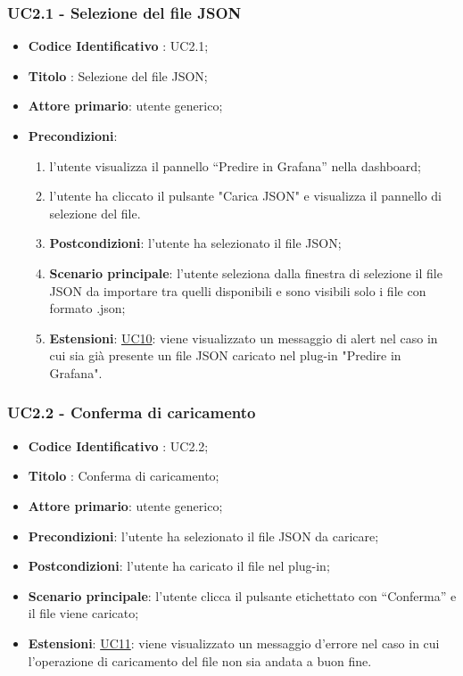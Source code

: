 		
		\label{par:UC2.1}
		\subsubsection{UC2.1 - Selezione del file JSON}
		\begin{itemize}
			\item\textbf{Codice Identificativo} : UC2.1;
			\item\textbf{Titolo} : Selezione del file JSON;
			\item\textbf{Attore primario}: utente generico;
			\item\textbf{Precondizioni}:
				\begin{enumerate}
					\item l'utente visualizza il pannello “Predire in Grafana” nella dashboard;
					\item l'utente ha cliccato il pulsante "Carica JSON" e visualizza il pannello di selezione del file.
			\item\textbf{Postcondizioni}: l'utente ha selezionato il file JSON;
			\item\textbf{Scenario principale}: l'utente seleziona dalla finestra di selezione il file JSON da importare tra quelli disponibili e sono visibili solo i file con formato .json;
			\item\textbf{Estensioni}: \hyperref[par:UC10]{UC10}: viene visualizzato un messaggio di alert nel caso in cui sia già presente un file JSON caricato nel plug-in "Predire in Grafana".
				\end{enumerate}
			\end{itemize}
		
		\label{par:UC2.2}
		\subsubsection{UC2.2 - Conferma di caricamento}
		\begin{itemize}
			\item\textbf{Codice Identificativo} : UC2.2;
			\item\textbf{Titolo} : Conferma di caricamento;
			\item\textbf{Attore primario}: utente generico;
			\item\textbf{Precondizioni}: l'utente ha selezionato il file JSON da caricare;
			\item\textbf{Postcondizioni}: l'utente ha caricato il file nel plug-in;
			\item\textbf{Scenario principale}: l'utente clicca il pulsante etichettato con “Conferma” e il file viene caricato;
			\item\textbf{Estensioni}: \hyperref[par:UC11]{UC11}: viene visualizzato un messaggio d'errore nel caso in cui l'operazione di caricamento del file non sia andata a buon fine.
					
		\end{itemize}
		
